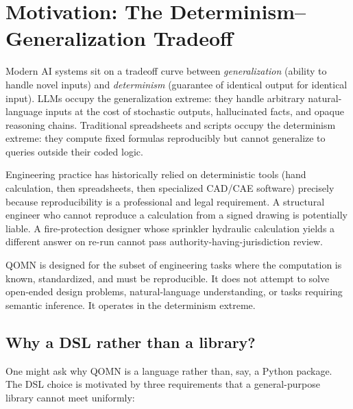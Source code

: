 \documentclass[11pt,a4paper]{article}
\begin{document}
\section{Motivation: The Determinism--Generalization Tradeoff}
\label{sec:motivation}

Modern AI systems sit on a tradeoff curve between \emph{generalization} (ability to handle novel inputs) and \emph{determinism} (guarantee of identical output for identical input). LLMs occupy the generalization extreme: they handle arbitrary natural-language inputs at the cost of stochastic outputs, hallucinated facts, and opaque reasoning chains. Traditional spreadsheets and scripts occupy the determinism extreme: they compute fixed formulas reproducibly but cannot generalize to queries outside their coded logic.

Engineering practice has historically relied on deterministic tools (hand calculation, then spreadsheets, then specialized CAD/CAE software) precisely because reproducibility is a professional and legal requirement. A structural engineer who cannot reproduce a calculation from a signed drawing is potentially liable. A fire-protection designer whose sprinkler hydraulic calculation yields a different answer on re-run cannot pass authority-having-jurisdiction review.

QOMN is designed for the subset of engineering tasks where the computation is known, standardized, and must be reproducible. It does not attempt to solve open-ended design problems, natural-language understanding, or tasks requiring semantic inference. It operates in the determinism extreme.

\subsection{Why a DSL rather than a library?}

One might ask why QOMN is a language rather than, say, a Python package. The DSL choice is motivated by three requirements that a general-purpose library cannot meet uniformly:
\end{document}
